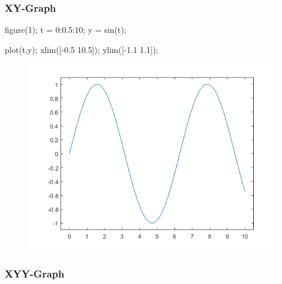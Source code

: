 \documentclass[
  10pt,
  a4paper,
  twocolumn]{article}
\newenvironment{Shaded}{}{}
\newcommand{\FloatTok}[1]{\textcolor[rgb]{0.00,0.36,0.77}{#1}}
\newcommand{\NormalTok}[1]{\textcolor[rgb]{0.14,0.16,0.18}{#1}}
\newcommand{\OperatorTok}[1]{\textcolor[rgb]{0.14,0.16,0.18}{#1}}
\newcommand{\VariableTok}[1]{\textcolor[rgb]{0.89,0.38,0.04}{#1}}
\numberwithin{equation}{section}
\begin{document}
\hypertarget{xy-graph}{%
\subsubsection{XY-Graph}\label{xy-graph}}

\begin{Shaded}
\begin{Highlighting}[]
\VariableTok{figure}\NormalTok{(}\FloatTok{1}\NormalTok{)}\OperatorTok{;}
\VariableTok{t} \OperatorTok{=} \FloatTok{0}\OperatorTok{:}\FloatTok{0.5}\OperatorTok{:}\FloatTok{10}\OperatorTok{;}
\VariableTok{y} \OperatorTok{=} \VariableTok{sin}\NormalTok{(}\VariableTok{t}\NormalTok{)}\OperatorTok{;}

\VariableTok{plot}\NormalTok{(}\VariableTok{t}\OperatorTok{,}\VariableTok{y}\NormalTok{)}\OperatorTok{;}
\VariableTok{xlim}\NormalTok{([}\OperatorTok{{-}}\FloatTok{0.5} \FloatTok{10.5}\NormalTok{])}\OperatorTok{;}
\VariableTok{ylim}\NormalTok{([}\OperatorTok{{-}}\FloatTok{1.1} \FloatTok{1.1}\NormalTok{])}\OperatorTok{;}
\end{Highlighting}
\end{Shaded}

\begin{figure}[H]

{\centering \includegraphics{images/plot_simple.png}

}

\end{figure}

\hypertarget{xyy-graph}{%
\subsubsection{XYY-Graph}\label{xyy-graph}}
\end{document}
